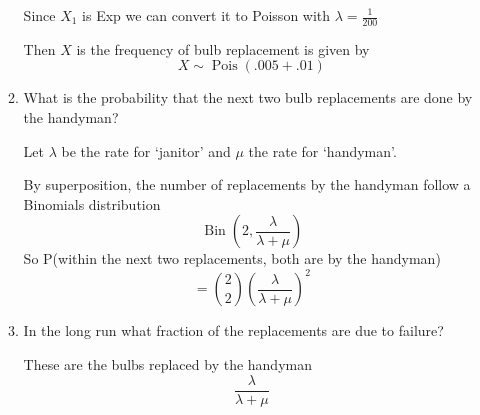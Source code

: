 \documentclass{article} %
\theoremstyle{plain}
\theoremstyle{case}
\begin{document}
\begin{enumerate}[label={\fbox{\textbf{Exercise \#\arabic* :}}}]
\begin{enumerate}
        Since $X_1$ is Exp we can convert it to Poisson with
        $\lambda = \frac{1}{200}$

        Then $X$ is the frequency of bulb replacement is given by
        \[ X \sim \operatorname{Pois}(.005 + .01) \]

      \item  What is the probability that the next two bulb replacements are done by the handyman?

        Let $\lambda$ be the rate for `janitor' and $\mu$ the rate
        for `handyman'.

        By superposition, the number of replacements by the handyman
        follow a Binomials distribution
        \[ \operatorname{Bin}\left(2,\frac{\lambda}{\lambda + \mu} \right) \]
        So P(within the next two replacements, both are by the handyman)
        \[ = \binom{2}{2} \left( \frac{\lambda}{\lambda + \mu} \right)^2  \]
      \item  In the long run what fraction of the replacements are due to failure?

        These are the bulbs replaced by the handyman
        \[ \frac{\lambda}{\lambda + \mu} \]


    \end{enumerate}
\end{enumerate}
%
%
\end{document}
